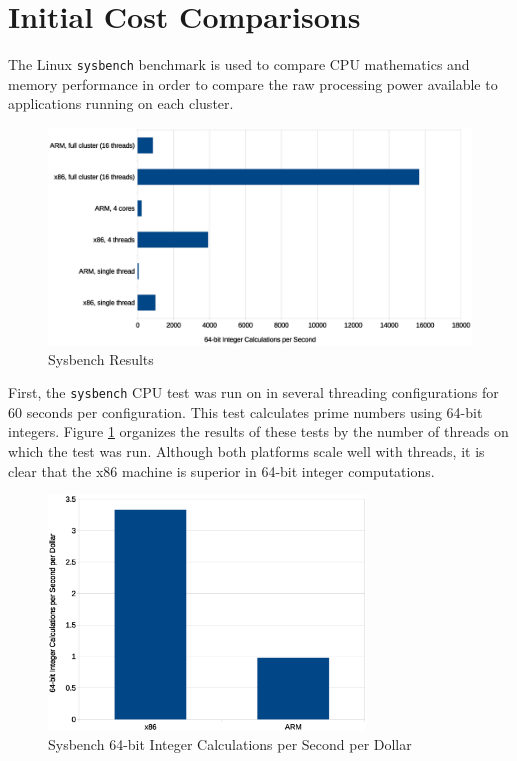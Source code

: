 \documentclass[11pt]{book}
\begin{document}
\section{Initial Cost Comparisons}

The Linux \verb;sysbench; benchmark is used to compare CPU mathematics and memory
performance in order to compare the raw processing power available to applications running
on each cluster.

\begin{figure}
\centering
\includegraphics[width=\textwidth]{sysbench_all}
\caption{Sysbench Results}
\label{sysbench-all}
\end{figure}

First, the \verb;sysbench; CPU test was run on in several threading configurations for 60
seconds per configuration.  This test calculates prime numbers using 64-bit
integers.  Figure \ref{sysbench-all} organizes the results of these tests by the number of
threads on which the test was run. Although both platforms scale well with threads, it is
clear that the x86 machine is superior in 64-bit integer computations.

\begin{figure}
\centering
\includegraphics[width=0.75\textwidth]{sysbench_cost}
\caption{Sysbench 64-bit Integer Calculations per Second per Dollar}
\label{sysbench-cost}
\end{figure}
\end{document}
